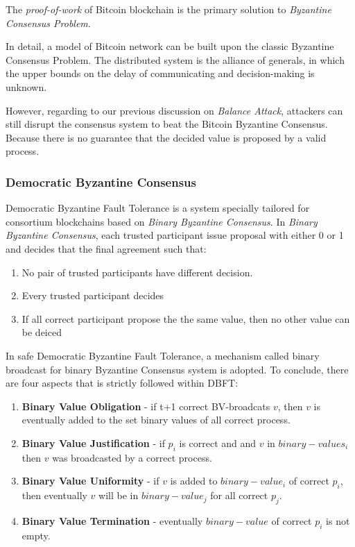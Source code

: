 \documentclass[12pt]{article}
\begin{document}
The \textit{proof-of-work} of Bitcoin blockchain is the primary solution to \textit{Byzantine Consensus Problem}. 

In detail, a model of Bitcoin network can be built upon the classic Byzantine Consensus Problem. The distributed system is the alliance of generals, in which the upper bounds on the delay of communicating and decision-making is unknown. 

However, regarding to our previous discussion on \textit{Balance Attack}, attackers can still disrupt the consensus system to beat the Bitcoin Byzantine Consensus\cite{gramoli2017blockchain}. Because there is no guarantee that the decided value is proposed by a valid process.

\subsubsection{Democratic Byzantine Consensus}

Democratic Byzantine Fault Tolerance is a system specially tailored for consortium blockchains based on \textit{Binary Byzantine Consensus}. In \textit{Binary Byzantine Consensus}\cite{mostefaoui2015signature}, each trusted participant issue proposal with either 0 or 1 and decides that the final agreement such that:

\begin{enumerate}
    \item No pair of trusted participants have different decision.
    \item Every trusted participant decides
    \item If all correct participant propose the the same value, then no other value can be deiced
\end{enumerate}

In safe Democratic Byzantine Fault Tolerance\cite{DBLP:journals/corr/CrainGLR17}, a mechanism called binary broadcast for binary Byzantine Consensus system is adopted. To conclude, there are four aspects that is strictly followed within DBFT:

\begin{enumerate}
    \item \textbf{Binary Value Obligation} - if t+1 correct BV-broadcats $v$, then $v$ is eventually added to the set binary values of all correct process.
    \item \textbf{Binary Value Justification} - if $p_i$ is correct and and $v$ in $binary-values_i$ then $v$ was broadcasted by a correct process.
    \item \textbf{Binary Value Uniformity} - if $v$ is added to $binary-value_i$ of correct $p_i$, then eventually $v$ will be in $binary-value_j$ for all correct $p_j$.
    \item \textbf{Binary Value Termination} - eventually $binary-value$ of correct $p_i$ is not empty. 
\end{enumerate}
\end{document}
